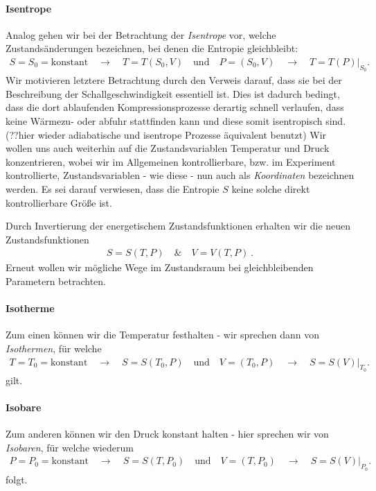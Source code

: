 \paragraph*{Isentrope}
Analog gehen wir bei der Betrachtung der \emph{Isentrope} vor, welche Zustandsänderungen bezeichnen, bei denen die Entropie gleichbleibt: 
\begin{align*}
    S=S_0=\text{konstant}\quad\rightarrow\quad T=T(S_0,V) \quad\text{und}\quad P=(S_0,V) \quad\rightarrow\quad T=T(P)|_{S_0}.
\end{align*}
Wir motivieren letztere Betrachtung durch den Verweis darauf, dass sie bei der Beschreibung der Schallgeschwindigkeit essentiell ist. Dies ist dadurch bedingt, dass die dort ablaufenden Kompressionsprozesse derartig schnell verlaufen, dass keine Wärmezu- oder abfuhr stattfinden kann und diese somit isentropisch sind. (??hier wieder adiabatische und isentrope Prozesse äquivalent benutzt)
Wir wollen uns auch weiterhin auf die Zustandsvariablen Temperatur und Druck konzentrieren, wobei wir im Allgemeinen kontrollierbare, bzw. im Experiment kontrollierte, Zustandsvariablen - wie diese - nun auch als \emph{Koordinaten} bezeichnen werden. Es sei darauf verwiesen, dass die Entropie $S$ keine solche direkt kontrollierbare Größe ist.

Durch Invertierung der energetischem Zustandsfunktionen erhalten wir die neuen Zustandsfunktionen 
\begin{align*}
    \boxed{S=S(T,P) \quad\&\quad V=V(T,P)}\:.
\end{align*} 
Erneut wollen wir mögliche Wege im Zustandsraum bei gleichbleibenden Parametern betrachten.
\paragraph*{Isotherme}
Zum einen können wir die Temperatur festhalten - wir sprechen dann von \emph{Isothermen}, für welche 
\begin{align*}
    T=T_0=\text{konstant}\quad\rightarrow\quad S=S(T_0,P) \quad\text{und}\quad V=(T_0,P) \quad\rightarrow\quad S=S(V)|_{T_0}.
\end{align*} gilt.
\paragraph*{Isobare}
Zum anderen können wir den Druck konstant halten - hier sprechen wir von \emph{Isobaren}, für welche wiederum
\begin{align*}
    P=P_0=\text{konstant}\quad\rightarrow\quad S=S(T,P_0) \quad\text{und}\quad V=(T,P_0) \quad\rightarrow\quad S=S(V)|_{P_0}.
\end{align*} folgt.

